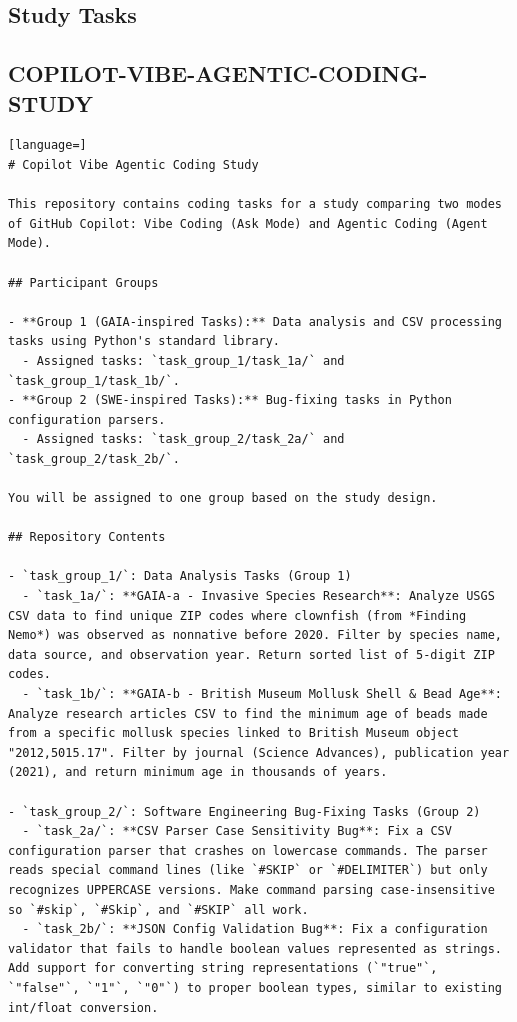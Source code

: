 \begin{appendices}
\appendix
\chapter{Study Tasks}

\section[Github Repo Explanation]{COPILOT-VIBE-AGENTIC-CODING-STUDY}
\label{app:repo}
\begin{lstlisting}[language=]
# Copilot Vibe Agentic Coding Study

This repository contains coding tasks for a study comparing two modes of GitHub Copilot: Vibe Coding (Ask Mode) and Agentic Coding (Agent Mode).

## Participant Groups

- **Group 1 (GAIA-inspired Tasks):** Data analysis and CSV processing tasks using Python's standard library.
  - Assigned tasks: `task_group_1/task_1a/` and `task_group_1/task_1b/`.
- **Group 2 (SWE-inspired Tasks):** Bug-fixing tasks in Python configuration parsers.
  - Assigned tasks: `task_group_2/task_2a/` and `task_group_2/task_2b/`.

You will be assigned to one group based on the study design.

## Repository Contents

- `task_group_1/`: Data Analysis Tasks (Group 1)
  - `task_1a/`: **GAIA-a - Invasive Species Research**: Analyze USGS CSV data to find unique ZIP codes where clownfish (from *Finding Nemo*) was observed as nonnative before 2020. Filter by species name, data source, and observation year. Return sorted list of 5-digit ZIP codes.
  - `task_1b/`: **GAIA-b - British Museum Mollusk Shell & Bead Age**: Analyze research articles CSV to find the minimum age of beads made from a specific mollusk species linked to British Museum object "2012,5015.17". Filter by journal (Science Advances), publication year (2021), and return minimum age in thousands of years.

- `task_group_2/`: Software Engineering Bug-Fixing Tasks (Group 2)
  - `task_2a/`: **CSV Parser Case Sensitivity Bug**: Fix a CSV configuration parser that crashes on lowercase commands. The parser reads special command lines (like `#SKIP` or `#DELIMITER`) but only recognizes UPPERCASE versions. Make command parsing case-insensitive so `#skip`, `#Skip`, and `#SKIP` all work.
  - `task_2b/`: **JSON Config Validation Bug**: Fix a configuration validator that fails to handle boolean values represented as strings. Add support for converting string representations (`"true"`, `"false"`, `"1"`, `"0"`) to proper boolean types, similar to existing int/float conversion.


\end{lstlisting}
\end{appendices}
